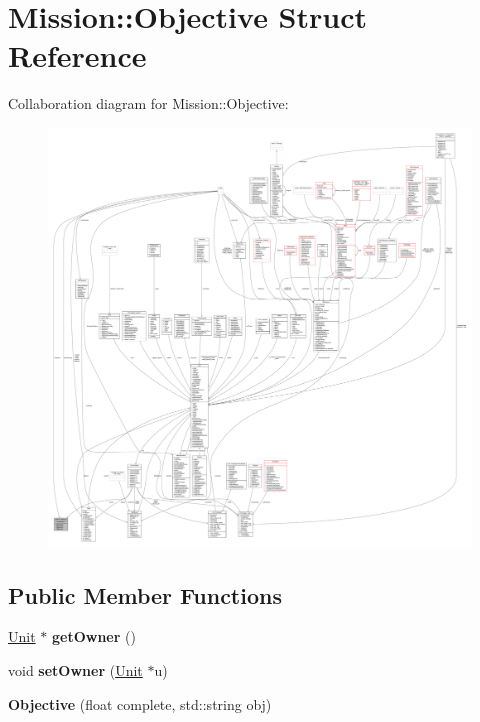 \hypertarget{structMission_1_1Objective}{}\section{Mission\+:\+:Objective Struct Reference}
\label{structMission_1_1Objective}


Collaboration diagram for Mission\+:\+:Objective\+:
\nopagebreak
\begin{figure}[H]
\begin{center}
\leavevmode
\includegraphics[width=350pt]{d3/d71/structMission_1_1Objective__coll__graph}
\end{center}
\end{figure}
\subsection*{Public Member Functions}
\begin{DoxyCompactItemize}
\item 
\hyperlink{classUnit}{Unit} $\ast$ {\bfseries get\+Owner} ()\hypertarget{structMission_1_1Objective_a351027f81e53e06b195f48844e3ce707}{}\label{structMission_1_1Objective_a351027f81e53e06b195f48844e3ce707}

\item 
void {\bfseries set\+Owner} (\hyperlink{classUnit}{Unit} $\ast$u)\hypertarget{structMission_1_1Objective_a95d14da9cbcfb17c0de665aad1202206}{}\label{structMission_1_1Objective_a95d14da9cbcfb17c0de665aad1202206}

\item 
{\bfseries Objective} (float complete, std\+::string obj)\hypertarget{structMission_1_1Objective_aa87c6ac26d3e5232471214fea1d261c9}{}\label{structMission_1_1Objective_aa87c6ac26d3e5232471214fea1d261c9}

\end{DoxyCompactItemize}
